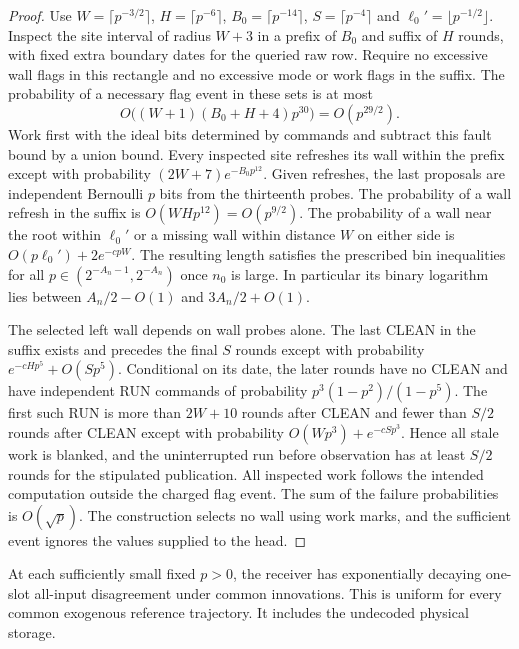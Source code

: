 \begin{proof}
Use \(W=\lceil p^{-3/2}\rceil\), \(H=\lceil p^{-6}\rceil\), \(B_0=\lceil p^{-14}\rceil\), \(S=\lceil p^{-4}\rceil\) and \(\ell_0'=\lfloor p^{-1/2}\rfloor\). Inspect the site interval of radius \(W+3\) in a prefix of \(B_0\) and suffix of \(H\) rounds, with fixed extra boundary dates for the queried raw row. Require no excessive wall flags in this rectangle and no excessive mode or work flags in the suffix. The probability of a necessary flag event in these sets is at most
\[
O\bigl((W+1)(B_0+H+4)p^{30}\bigr)=O(p^{29/2}).
\]
Work first with the ideal bits determined by commands and subtract this fault bound by a union bound. Every inspected site refreshes its wall within the prefix except with probability \((2W+7)e^{-B_0p^{12}}\). Given refreshes, the last proposals are independent Bernoulli \(p\) bits from the thirteenth probes. The probability of a wall refresh in the suffix is \(O(WHp^{12})=O(p^{9/2})\). The probability of a wall near the root within \(\ell_0'\) or a missing wall within distance \(W\) on either side is \(O(p\ell_0')+2e^{-cpW}\). The resulting length satisfies the prescribed bin inequalities for all \(p\in(2^{-A_n-1},2^{-A_n})\) once \(n_0\) is large. In particular its binary logarithm lies between \(A_n/2-O(1)\) and \(3A_n/2+O(1)\).

The selected left wall depends on wall probes alone. The last CLEAN in the suffix exists and precedes the final \(S\) rounds except with probability \(e^{-cHp^5}+O(Sp^5)\). Conditional on its date, the later rounds have no CLEAN and have independent RUN commands of probability \(p^3(1-p^2)/(1-p^5)\). The first such RUN is more than \(2W+10\) rounds after CLEAN and fewer than \(S/2\) rounds after CLEAN except with probability \(O(Wp^3)+e^{-cSp^3}\). Hence all stale work is blanked, and the uninterrupted run before observation has at least \(S/2\) rounds for the stipulated publication. All inspected work follows the intended computation outside the charged flag event. The sum of the failure probabilities is \(O(\sqrt p)\). The construction selects no wall using work marks, and the sufficient event ignores the values supplied to the head.
\end{proof}

\begin{lemma}\label{lem:receiver-mixing}
At each sufficiently small fixed \(p>0\), the receiver has exponentially decaying one-slot all-input disagreement under common innovations. This is uniform for every common exogenous reference trajectory. It includes the undecoded physical storage.
\end{lemma}

